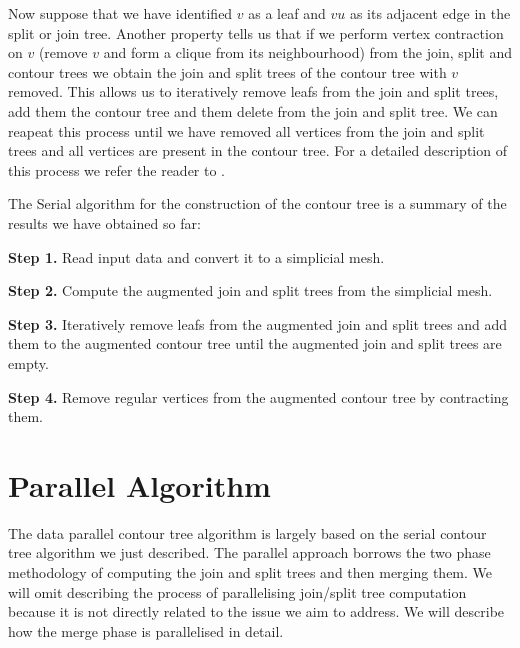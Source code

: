 Now suppose that we have identified $v$ as a leaf and $vu$ as its adjacent edge in the split or join tree. Another property \cite{carr-masters} tells us that if we perform vertex contraction on $v$ (remove $v$ and form a clique from its neighbourhood) from the join, split and contour trees we obtain the join and split trees of the contour tree with $v$ removed. This allows us to iteratively remove leafs from the join and split trees, add them the contour tree and them delete from the join and split tree. We can reapeat this process until we have removed all vertices from the join and split trees and all vertices are present in the contour tree. For a detailed description of this process we refer the reader to \cite{ct-big-paper}.


The Serial algorithm for the construction of the contour tree is a summary of the results we have obtained so far:

\textbf{Step 1.} Read input data and convert it to a simplicial mesh.

\textbf{Step 2.} Compute the augmented join and split trees from the simplicial mesh.

\textbf{Step 3.} Iteratively remove leafs from the augmented join and split trees and add them to the augmented contour tree until the augmented join and split trees are empty.

\textbf{Step 4.} Remove regular vertices from the augmented contour tree by contracting them.

\section{Parallel Algorithm}

The data parallel contour tree algorithm \cite{parallel-peak-pruning} is largely based on the serial contour tree algorithm we just described. The parallel approach borrows the two phase methodology of computing the join and split trees and then merging them. We will omit describing the process of parallelising join/split tree computation because it is not directly related to the issue we aim to address. We will describe how the merge phase is parallelised in detail.

